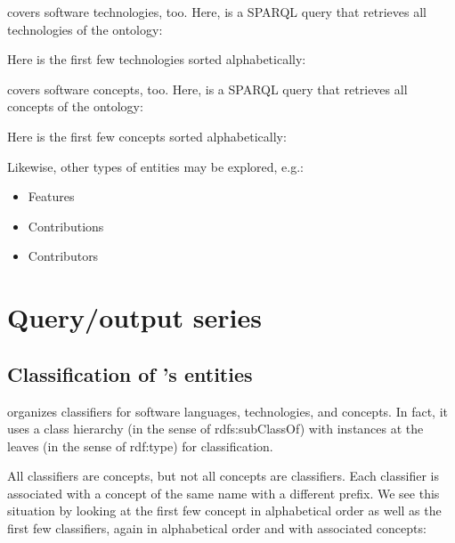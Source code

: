 \documentclass{llncs}
\begin{document}

\noindent
\solasote{} covers software technologies, too. Here, is a SPARQL query
that retrieves all technologies of the ontology:


\noindent
Here is the first few technologies sorted alphabetically:


\noindent
\solasote{} covers software concepts, too. Here, is a SPARQL query
that retrieves all concepts of the ontology:


\noindent
Here is the first few concepts sorted alphabetically:




Likewise, other types of entities may be explored, e.g.:

\begin{itemize}
\item Features
\item Contributions
\item Contributors
\end{itemize}



\section{Query/output series}


\subsection{Classification of \solasote's entities}

\solasote{} organizes classifiers for software languages,
technologies, and concepts. In fact, it uses a class hierarchy (in the
sense of rdfs:subClassOf) with instances at the leaves (in the sense
of rdf:type) for classification.

All classifiers are concepts, but not all concepts are
classifiers. Each classifier is associated with a concept of the same
name with a different prefix. We see this situation by looking at the
first few concept in alphabetical order as well as the first few
classifiers, again in alphabetical order and with associated concepts: 
\end{document}
